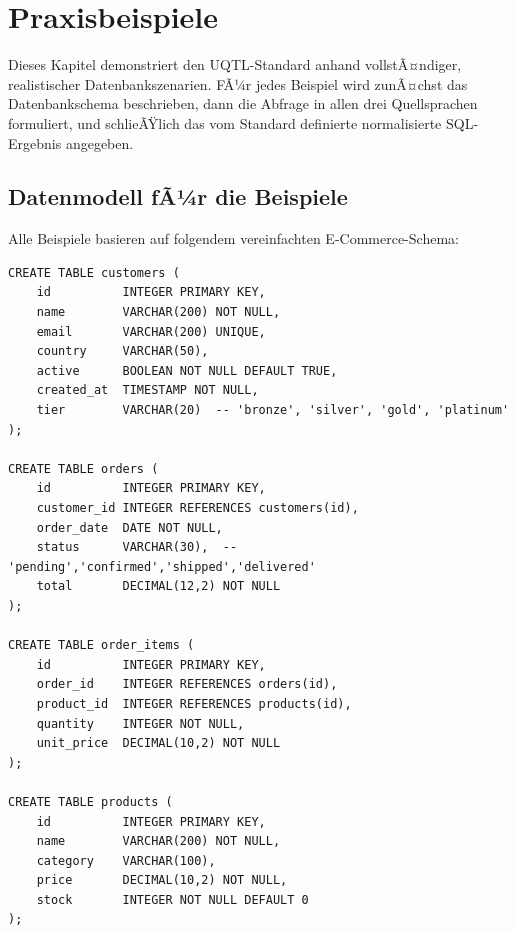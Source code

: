 ﻿%
\section{Praxisbeispiele}
\label{sec:beispiele}

Dieses Kapitel demonstriert den UQTL-Standard anhand vollstÃ¤ndiger,
realistischer Datenbankszenarien. FÃ¼r jedes Beispiel wird zunÃ¤chst das
Datenbankschema beschrieben, dann die Abfrage in allen drei Quellsprachen
formuliert, und schlieÃŸlich das vom Standard definierte normalisierte
SQL-Ergebnis angegeben.

\subsection{Datenmodell fÃ¼r die Beispiele}
\label{subsec:datenmodell}

Alle Beispiele basieren auf folgendem vereinfachten E-Commerce-Schema:

\begin{lstlisting}[style=sqlstyle, caption={Datenbankschema fÃ¼r Beispiele},
  label=lst:schema]
CREATE TABLE customers (
    id          INTEGER PRIMARY KEY,
    name        VARCHAR(200) NOT NULL,
    email       VARCHAR(200) UNIQUE,
    country     VARCHAR(50),
    active      BOOLEAN NOT NULL DEFAULT TRUE,
    created_at  TIMESTAMP NOT NULL,
    tier        VARCHAR(20)  -- 'bronze', 'silver', 'gold', 'platinum'
);

CREATE TABLE orders (
    id          INTEGER PRIMARY KEY,
    customer_id INTEGER REFERENCES customers(id),
    order_date  DATE NOT NULL,
    status      VARCHAR(30),  -- 'pending','confirmed','shipped','delivered'
    total       DECIMAL(12,2) NOT NULL
);

CREATE TABLE order_items (
    id          INTEGER PRIMARY KEY,
    order_id    INTEGER REFERENCES orders(id),
    product_id  INTEGER REFERENCES products(id),
    quantity    INTEGER NOT NULL,
    unit_price  DECIMAL(10,2) NOT NULL
);

CREATE TABLE products (
    id          INTEGER PRIMARY KEY,
    name        VARCHAR(200) NOT NULL,
    category    VARCHAR(100),
    price       DECIMAL(10,2) NOT NULL,
    stock       INTEGER NOT NULL DEFAULT 0
);
\end{lstlisting}

